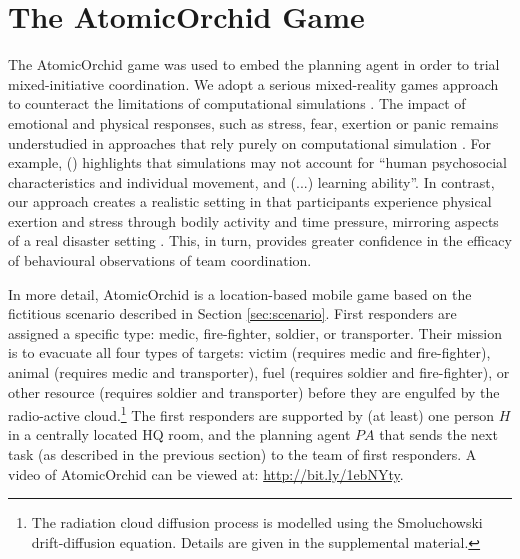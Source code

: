 \section{The A\lowercase{tomic}O\lowercase{rchid} Game}\label{sec:atomicorchid}
\noindent The AtomicOrchid game was used to embed the planning agent in order to trial mixed-initiative coordination.
We adopt a serious mixed-reality games approach to counteract the limitations of computational simulations \cite{Fischer:etal:2012}. The impact of emotional and physical responses, such as stress, fear, exertion or panic remains understudied in approaches that rely purely on computational simulation \cite{drury:etal:2009}. For example, \citeauthor{simonovic:2009} (\citeyear{simonovic:2009}) highlights that simulations may not account for ``human psychosocial characteristics and individual movement, and (...) learning ability''. In contrast, our approach creates a realistic setting in that participants experience physical exertion and stress through bodily activity and time pressure, mirroring aspects of a real disaster setting \cite{paho:2001}. This, in turn, provides greater confidence in the efficacy of behavioural observations of team coordination.

In more detail, AtomicOrchid is a location-based mobile game based on the fictitious scenario described in Section \ref{sec:scenario}. First responders are assigned a specific type: medic, fire-fighter, soldier, or transporter. Their mission is to evacuate all four types of targets: victim (requires medic and fire-fighter), animal (requires medic and transporter), fuel (requires soldier and fire-fighter), or other resource (requires soldier and transporter) before they are engulfed by the radio-active cloud.\footnote{The radiation cloud diffusion process is modelled using the Smoluchowski drift-diffusion equation. Details are given in the supplemental material.}  The first responders are supported by (at least) one person $H$ in a centrally located HQ room, and the planning agent $PA$ that sends the next task (as described in the previous section) to the team of first responders. A video of AtomicOrchid can be viewed at: {\small \url{http://bit.ly/1ebNYty}}.


%



